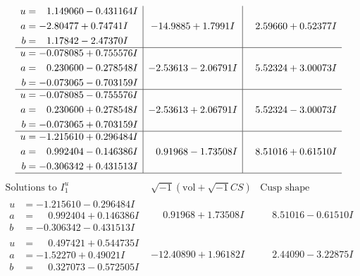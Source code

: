 \documentclass[1p]{elsarticle_modified}
\theoremstyle{definition}
\newcommand{\I}{\sqrt{-1}}
\begin{document}
$$\begin{array}{c|c|c}
\begin{aligned}
u &= \phantom{-}1.149060 - 0.431164 I \\
a &= -2.80477 + 0.74741 I \\
b &= \phantom{-}1.17842 - 2.47370 I\end{aligned}
 & -14.9885 + 1.7991 I & \phantom{-}2.59660 + 0.52377 I \\ \hline\begin{aligned}
u &= -0.078085 + 0.755576 I \\
a &= \phantom{-}0.230600 - 0.278548 I \\
b &= -0.073065 - 0.703159 I\end{aligned}
 & -2.53613 - 2.06791 I & \phantom{-}5.52324 + 3.00073 I \\ \hline\begin{aligned}
u &= -0.078085 - 0.755576 I \\
a &= \phantom{-}0.230600 + 0.278548 I \\
b &= -0.073065 + 0.703159 I\end{aligned}
 & -2.53613 + 2.06791 I & \phantom{-}5.52324 - 3.00073 I \\ \hline\begin{aligned}
u &= -1.215610 + 0.296484 I \\
a &= \phantom{-}0.992404 - 0.146386 I \\
b &= -0.306342 + 0.431513 I\end{aligned}
 & \phantom{-}0.91968 - 1.73508 I & \phantom{-}8.51016 + 0.61510 I\\
 \hline 
 \end{array}$$\newpage$$\begin{array}{c|c|c}  
\text{Solutions to }I^u_{1}& \I (\text{vol} + \sqrt{-1}CS) & \text{Cusp shape}\\
 \hline 
\begin{aligned}
u &= -1.215610 - 0.296484 I \\
a &= \phantom{-}0.992404 + 0.146386 I \\
b &= -0.306342 - 0.431513 I\end{aligned}
 & \phantom{-}0.91968 + 1.73508 I & \phantom{-}8.51016 - 0.61510 I \\ \hline\begin{aligned}
u &= \phantom{-}0.497421 + 0.544735 I \\
a &= -1.52270 + 0.49021 I \\
b &= \phantom{-}0.327073 - 0.572505 I\end{aligned}
 & -12.40890 + 1.96182 I & \phantom{-}2.44090 - 3.22875 I \\ \hline\begin{aligned}

\end{aligned}
\end{array}$$
\end{document}
